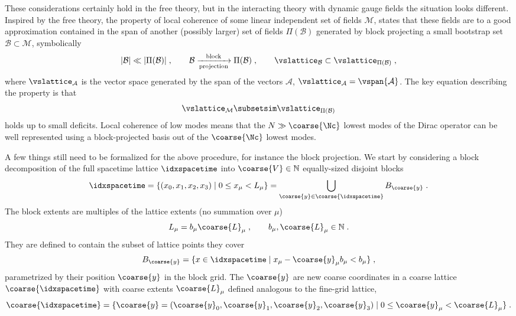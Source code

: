 These considerations certainly hold in the free theory, but in the interacting theory with dynamic gauge fields the situation looks different.
Inspired by the free theory, the property of local coherence of some linear independent set of fields $\mathcal{M}$, states that these fields are to a good approximation contained in the span of another (possibly larger) set of fields $\Pi(\mathcal{B})$ generated by block projecting a small bootstrap set $\mathcal{B} \subset \mathcal{M}$, symbolically
\begin{equation} \label{eq:local:coherence:sets}
\lvert \mathcal{B} \rvert \ll \lvert \Pi(\mathcal{B}) \rvert \;,
\qquad
\mathcal{B} \xrightarrow[\text{projection}]{\text{block}} \Pi(\mathcal{B}) \;,
\qquad
\vslattice_{\mathcal{B}} \subset \vslattice_{\Pi(\mathcal{B})} \;,
\end{equation}
where $\vslattice_{\mathcal{A}}$ is the vector space generated by the span of the vectors $\mathcal{A}$, $\vslattice_{\mathcal{A}} = \vspan{\mathcal{A}}$.
The key equation describing the property is that
\begin{equation} \label{eq:local:coherence:set:approx}
\vslattice_{\mathcal{M}} \subsetsim \vslattice_{\Pi(\mathcal{B})}
\end{equation}
holds up to small deficits.
Local coherence of low modes means that the $N \gg \coarse{\Nc}$ lowest modes of the Dirac operator can be well represented using a block-projected basis out of the $\coarse{\Nc}$ lowest modes.

A few things still need to be formalized for the above procedure, for instance the block projection.
We start by considering a block decomposition of the full spacetime lattice $\idxspacetime$ into $\coarse{V} \in \mathbb{N}$ equally-sized disjoint blocks
\begin{equation} \label{eq:coarse:lattice}
\idxspacetime
= \{ (x_0,x_1,x_2,x_3) \mid 0 \leq x_{\mu} < L_{\mu} \}
= \bigcup_{\coarse{y} \in \coarse{\idxspacetime}} B_{\coarse{y}} \;.
\end{equation}
The block extents are multiples of the lattice extents (no summation over $\mu$)
\begin{equation}
L_{\mu} = b_{\mu} \coarse{L}_{\mu} \;,
\qquad
b_{\mu}, \coarse{L}_{\mu} \in \mathbb{N} \;.
\end{equation}
They are defined to contain the subset of lattice points they cover
\begin{equation}
B_{\coarse{y}} = \{ x \in \idxspacetime \mid x_{\mu} - \coarse{y}_{\mu} b_{\mu} < b_{\mu} \} \;,
\end{equation}
parametrized by their position $\coarse{y}$ in the block grid.
The $\coarse{y}$ are new coarse coordinates in a coarse lattice $\coarse{\idxspacetime}$ with coarse extents $\coarse{L}_{\mu}$ defined analogous to the fine-grid lattice,
\begin{equation}
\coarse{\idxspacetime} = \{ \coarse{y} = (\coarse{y}_0, \coarse{y}_1, \coarse{y}_2, \coarse{y}_3) \mid 0 \leq \coarse{y}_\mu < \coarse{L}_\mu\} \;.
\end{equation}

